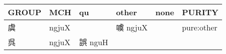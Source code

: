 \documentclass[14pt,a4paper]{scrartcl}
\begin{document}
\begin{longtable}[c]{@{}llllll@{}}
\toprule
\begin{minipage}[b]{0.14\columnwidth}\raggedright\strut
GROUP
\strut\end{minipage} &
\begin{minipage}[b]{0.14\columnwidth}\raggedright\strut
MCH
\strut\end{minipage} &
\begin{minipage}[b]{0.14\columnwidth}\raggedright\strut
qu
\strut\end{minipage} &
\begin{minipage}[b]{0.14\columnwidth}\raggedright\strut
other
\strut\end{minipage} &
\begin{minipage}[b]{0.14\columnwidth}\raggedright\strut
none
\strut\end{minipage} &
\begin{minipage}[b]{0.14\columnwidth}\raggedright\strut
PURITY
\strut\end{minipage}\tabularnewline
\midrule
\endhead
\begin{minipage}[t]{0.14\columnwidth}\raggedright\strut
虞
\strut\end{minipage} &
\begin{minipage}[t]{0.14\columnwidth}\raggedright\strut
ngjuX
\strut\end{minipage} &
\begin{minipage}[t]{0.14\columnwidth}\raggedright\strut
\strut\end{minipage} &
\begin{minipage}[t]{0.14\columnwidth}\raggedright\strut
噳 ngjuX
\strut\end{minipage} &
\begin{minipage}[t]{0.14\columnwidth}\raggedright\strut
\strut\end{minipage} &
\begin{minipage}[t]{0.14\columnwidth}\raggedright\strut
pure:other
\strut\end{minipage}\tabularnewline
\begin{minipage}[t]{0.14\columnwidth}\raggedright\strut
呉
\strut\end{minipage} &
\begin{minipage}[t]{0.14\columnwidth}\raggedright\strut
ngjuX
\strut\end{minipage} &
\begin{minipage}[t]{0.14\columnwidth}\raggedright\strut
誤 nguH
\strut\end{minipage} &
\begin{minipage}[t]{0.14\columnwidth}\raggedright\strut

\end{minipage}
\end{longtable}
\end{document}

